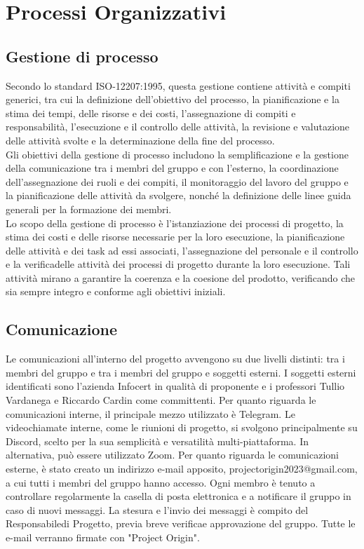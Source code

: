 \section{Processi Organizzativi}

\subsection{Gestione di processo}
Secondo lo standard ISO-12207:1995, questa gestione contiene attività e compiti generici, tra cui la definizione dell'obiettivo del processo\glo, la pianificazione e la stima 
dei tempi, delle risorse e dei costi, l'assegnazione di compiti e responsabilità, l'esecuzione e il controllo delle attività, la revisione e valutazione delle attività svolte 
e la determinazione della fine del processo. \\
Gli obiettivi della gestione di processo includono la semplificazione e la gestione della comunicazione tra i membri del gruppo e con l'esterno, la coordinazione 
dell'assegnazione dei ruoli e dei compiti, il monitoraggio del lavoro del gruppo e la pianificazione delle attività da svolgere, nonché la definizione delle linee guida 
generali per la formazione dei membri. \\
Lo scopo della gestione di processo è l'istanziazione dei processi di progetto, la stima dei costi e delle risorse necessarie per la loro esecuzione, la pianificazione 
delle attività e dei task ad essi associati, l'assegnazione del personale e il controllo e la verifica\glo delle attività dei processi di progetto durante la loro esecuzione. 
Tali attività mirano a garantire la coerenza e la coesione del prodotto, verificando che sia sempre integro e conforme agli obiettivi iniziali.

\subsection{Comunicazione}
Le comunicazioni all'interno del progetto avvengono su due livelli distinti: tra i membri del gruppo e tra i membri del gruppo e soggetti esterni. I soggetti esterni 
identificati sono l'azienda Infocert in qualità di proponente e i professori Tullio Vardanega e Riccardo Cardin come committenti. Per quanto riguarda le comunicazioni interne, 
il principale mezzo utilizzato è Telegram\glo. Le videochiamate interne, come le riunioni di progetto, si svolgono principalmente su Discord\glo, scelto per la sua semplicità e 
versatilità multi-piattaforma. In alternativa, può essere utilizzato Zoom\glo. Per quanto riguarda le comunicazioni esterne, è stato creato un indirizzo e-mail 
apposito, projectorigin2023@gmail.com, a cui tutti i membri del gruppo hanno accesso. Ogni membro è tenuto a controllare regolarmente la casella di posta elettronica e a 
notificare il gruppo in caso di nuovi messaggi. La stesura e l'invio dei messaggi è compito del Responsabile\glo di Progetto, previa breve verifica\glo e approvazione del gruppo. 
Tutte le e-mail verranno firmate con "Project Origin". 

